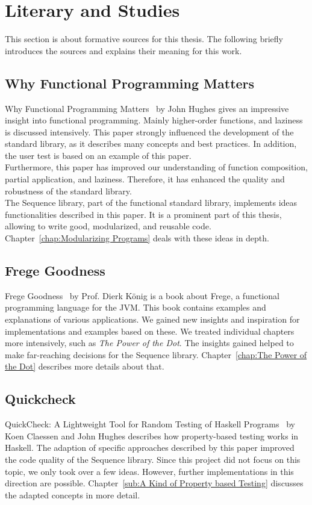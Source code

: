 \section{Literary and Studies}
\label{sec:Literary and Studies}
This section is about formative sources for this thesis. The following briefly
introduces the sources and explains their meaning for this work.

\subsection{Why Functional Programming Matters}
\label{sub:Functional Programming Matters}

Why Functional Programming Matters~\cite{hughes_why_1989} by John Hughes gives
an impressive insight into functional programming. Mainly higher-order
functions, and laziness is discussed intensively. This paper strongly
influenced the development of the standard library, as it describes many
concepts and best practices. In addition, the user test is based on an example
of this paper. \\ 
Furthermore, this paper has improved our understanding of function composition,
partial application, and laziness. Therefore, it has enhanced the quality and
robustness of the standard library. \\
The Sequence library, part of the functional standard library, implements ideas
functionalities described in this paper. It is a prominent part of this thesis,
allowing to write good, modularized, and reusable code.
Chapter~\ref{chap:Modularizing Programs} deals with these ideas in depth.


\subsection{Frege Goodness}
\label{sub:Frege Goodness}
Frege Goodness~\cite{frege_goodness} by Prof. Dierk König is a book about
Frege, a functional programming language for the JVM. This book contains
examples and explanations of various applications. We gained new insights and
inspiration for implementations and examples based on these. We treated
individual chapters more intensively, such as \textit{The Power of the Dot}.
The insights gained helped to make far-reaching decisions for the Sequence
library. Chapter~\ref{chap:The Power of the Dot} describes more details about
that.

\subsection{Quickcheck}
\label{sub:Quickcheck}
QuickCheck: A Lightweight Tool for Random Testing of Haskell
Programs~\cite{quickcheck_hughes} by Koen Claessen and John Hughes describes
how property-based testing works in Haskell. The adaption of specific
approaches described by this paper improved the code quality of the Sequence
library. Since this project did not focus on this topic, we only took over a few
ideas. However, further implementations in this direction are possible.
Chapter~\ref{sub:A Kind of Property based Testing} discusses the adapted
concepts in more detail. 


